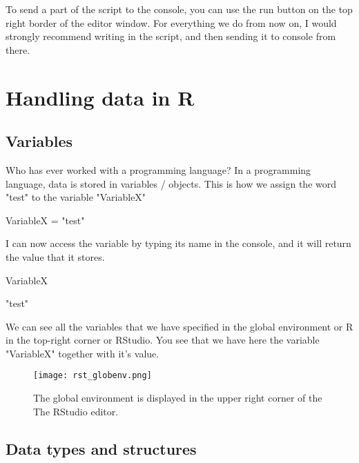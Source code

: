 \documentclass[a4paper,twoside]{tufte-book}\usepackage[]{graphicx}\usepackage[]{color}
\begin{document}
\begin{appendices}
To send a part of the script to the console, you can use the run button on the top right border of the editor window. For everything we do from now on, I would strongly recommend writing in the script, and then sending it to console from there. 

\chapter{Handling data in R}
\label{HandlingDataInR}

\section{Variables}

Who has ever worked with a programming language? In a programming language, data is stored in variables / objects. This is how we assign the word "test" to the variable "VariableX"

\begin{Schunk}
\begin{Sinput}
VariableX = "test"
\end{Sinput}
\end{Schunk}

I can now access the variable by typing its name in the console, and it will return the value that it stores.
\begin{Schunk}
\begin{Sinput}
VariableX
\end{Sinput}
\begin{Soutput}
[1] "test"
\end{Soutput}
\end{Schunk}

We can see all the variables that we have specified in the global environment or R in the top-right corner or RStudio. You see that we have here the variable "VariableX" together with it's value. 


\begin{figure}[]
\begin{center}
\texttt{[image: rst\_globenv.png]}
\caption{The global environment is displayed in the upper right corner of the The RStudio editor.}
\label{fig: Rstudio}
\end{center}
\end{figure}

\section{Data types and structures}


\end{appendices}
\end{document}
